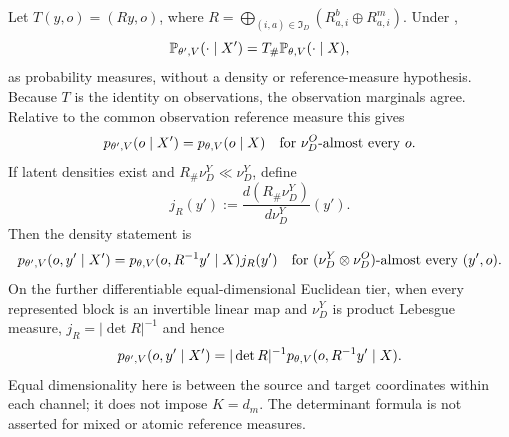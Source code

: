 Let
$T(y,o)=(Ry,o)$, where
$R=\bigoplus_{(i,a)\in\mathfrak I_D}(R_{a,i}^b\oplus R_{a,i}^m)$. Under
,
\begin{equation}
\mathbb P_{\theta',V}(\cdot\mid X')=T_{\#}\mathbb P_{\theta,V}(\cdot\mid X),
\label{eq:gen-gauge-joint-pushforward}
\end{equation}
as probability measures, without a density or reference-measure hypothesis.  Because $T$ is the
identity on observations, the observation marginals agree.  Relative to the common observation
reference measure this gives
\begin{equation}
p_{\theta',V}(o\mid X')=p_{\theta,V}(o\mid X)
\quad\text{for }\nu_D^O\text{-almost every }o.
\label{eq:gen-gauge-evidence-invariance}
\end{equation}
If latent densities exist and $R_\#\nu_D^Y\ll\nu_D^Y$, define
\begin{equation}
j_R(y'):=\frac{d(R_\#\nu_D^Y)}{d\nu_D^Y}(y').
\label{eq:gen-gauge-reference-rn}
\end{equation}
Then the density statement is
\begin{equation}
p_{\theta',V}(o,y'\mid X')
=p_{\theta,V}(o,R^{-1}y'\mid X)j_R(y')
\quad\text{for }(\nu_D^Y\otimes\nu_D^O)\text{-almost every }(y',o).
\label{eq:gen-gauge-rn-density}
\end{equation}
On the further differentiable equal-dimensional Euclidean tier, when every represented block is
an invertible linear map and $\nu_D^Y$ is product Lebesgue measure,
$j_R=|\det R|^{-1}$ and hence
\begin{equation}
p_{\theta',V}(o,y'\mid X')
=|\det R|^{-1}p_{\theta,V}(o,R^{-1}y'\mid X).
\label{eq:gen-gauge-lebesgue-density}
\end{equation}
Equal dimensionality here is between the source and target coordinates within each channel; it
does not impose $K=d_m$.  The determinant formula is not asserted for mixed or atomic reference
measures.

